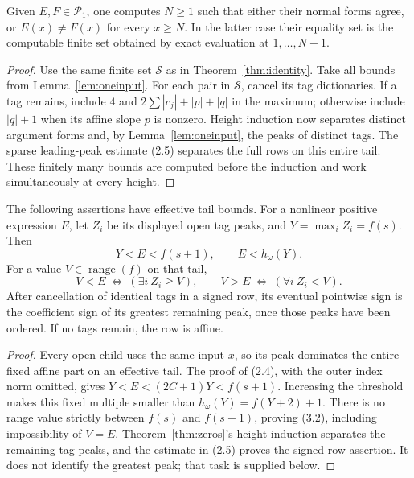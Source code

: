 \documentclass[11pt,a4paper]{article}
\begin{document}
\begin{theorem}\label{thm:zeros}
Given $E,F\in\mathcal P_1$, one computes $N\ge1$ such that either their
normal forms agree, or $E(x)\ne F(x)$ for every $x\ge N$. In the latter
case their equality set is the computable finite set obtained by exact
evaluation at $1,\ldots,N-1$.
\end{theorem}
\begin{proof}
Use the same finite set $\mathcal S$ as in Theorem~\ref{thm:identity}.
Take all bounds from Lemma~\ref{lem:oneinput}. For each pair in
$\mathcal S$, cancel its tag dictionaries. If a tag remains, include
$4$ and $2\sum|c_j|+|p|+|q|$ in the maximum; otherwise include
$|q|+1$ when its affine slope $p$ is nonzero. Height induction now
separates distinct argument forms and, by Lemma~\ref{lem:oneinput}, the
peaks of distinct tags. The sparse leading-peak estimate (2.5) separates
the full rows on this entire tail. These finitely many bounds are computed
before the induction and work simultaneously at every height.
\end{proof}

\begin{lemma}\label{lem:cells}
The following assertions have effective tail bounds.
For a nonlinear positive expression $E$, let $Z_i$ be its displayed open
tag peaks, and $Y=\max_i Z_i=f(s)$. Then
\[
              Y<E<f(s+1),\qquad E<h_\omega(Y).        \tag{3.1}
\]
For a value $V\in\operatorname{range}(f)$ on that tail,
\[
 V<E\ \Longleftrightarrow\ (\exists i\ Z_i\ge V),\qquad
 V>E\ \Longleftrightarrow\ (\forall i\ Z_i<V).       \tag{3.2}
\]
After cancellation of identical tags in a signed row, its eventual
pointwise sign is the coefficient sign of its greatest remaining peak,
once those peaks have been ordered. If no tags remain, the row is affine.
\end{lemma}
\begin{proof}
Every open child uses the same input $x$, so its peak dominates the entire
fixed affine part on an effective tail. The proof of (2.4), with the
outer index norm omitted, gives $Y<E<(2C+1)Y<f(s+1)$.
Increasing the threshold makes this fixed multiple smaller than
$h_\omega(Y)=f(Y+2)+1$. There is no range value strictly between $f(s)$
and $f(s+1)$, proving (3.2), including impossibility of $V=E$.
Theorem~\ref{thm:zeros}'s height induction separates the remaining tag peaks,
and the estimate in (2.5) proves the signed-row assertion. It does not
identify the greatest peak; that task is supplied below.
\end{proof}
\end{document}
